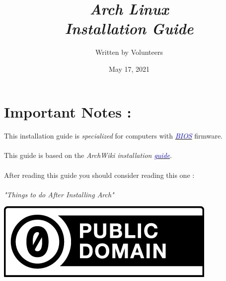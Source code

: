 \documentclass[12pt, a4paper]{article}
\title{\emph{Arch Linux} \\\emph{Installation Guide}}
\author{Written by Volunteers}
\date{May 17, 2021}
\begin{document}
\maketitle

\section*{Important Notes :}
\paragraph{}
This installation guide is \emph{specialized} for computers with \href{https://en.wikipedia.org/wiki/BIOS}{\textcolor{blue}{\emph{BIOS}}} firmware.
\paragraph{}
This guide is based on the \emph{ArchWiki installation} \href{https://wiki.archlinux.org/index.php/Installation_guide}{\emph{\textcolor{blue}{guide}}}.

\paragraph{}
After reading this guide you should consider reading this one :
\begin{LARGE}
	\paragraph{}
	\centering
	\emph{"Things to do After Installing Arch"}\\
\end{LARGE}

\begin{center}
	\includegraphics[scale=0.4]{cc-zero}
\end{center}
\end{document}
